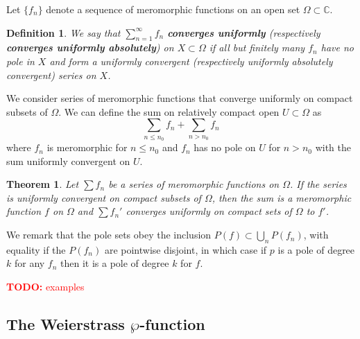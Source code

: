 \documentclass{article}
\newtheorem{theorem}{Theorem}
\newcommand{\mbb}[1]{\mathbb{#1}}
\newtheorem{definition}{Definition}
\newcommand{\TODO}[1]{\begin{center}\huge{\textcolor{red}{\textbf{TODO:} #1}}\end{center}}
\begin{document}
Let \(\{f_n\}\) denote a sequence of meromorphic functions on an open set \(\Omega \subset \mbb{C}\).
\begin{definition}
We say that \(\sum_{n = 1}^\infty f_n\) \textbf{converges uniformly} (respectively \textbf{converges uniformly absolutely}) on \(X \subset \Omega\) if all but finitely many \(f_n\) have no pole in \(X\) and form a uniformly convergent (respectively uniformly absolutely convergent) series on \(X\).
\end{definition}
We consider series of meromorphic functions that converge uniformly on compact subsets of \(\Omega\). We can define the sum on relatively compact open \(U \subset \Omega\) as
\begin{equation}\sum_{n \leq n_0}f_n + \sum_{n > n_0}f_n\end{equation}
where \(f_n\) is meromorphic for \(n \leq n_0\) and \(f_n\) has no pole on \(U\) for \(n > n_0\) with the sum uniformly convergent on \(U\).
\begin{theorem}
Let \(\sum f_n\) be a series of meromorphic functions on \(\Omega\). If the series is uniformly convergent on compact subsets of \(\Omega\), then the sum is a meromorphic function \(f\) on \(\Omega\) and \(\sum f_n'\) converges uniformly on compact sets of \(\Omega\) to \(f'\).
\end{theorem}
We remark that the pole sets obey the inclusion \(P(f) \subset \bigcup_nP(f_n)\), with equality if the \(P(f_n)\) are pointwise disjoint, in which case if \(p\) is a pole of degree \(k\) for any \(f_n\) then it is a pole of degree \(k\) for \(f\).

\TODO{examples}

\subsection{The Weierstrass \(\wp\)-function}
\end{document}

